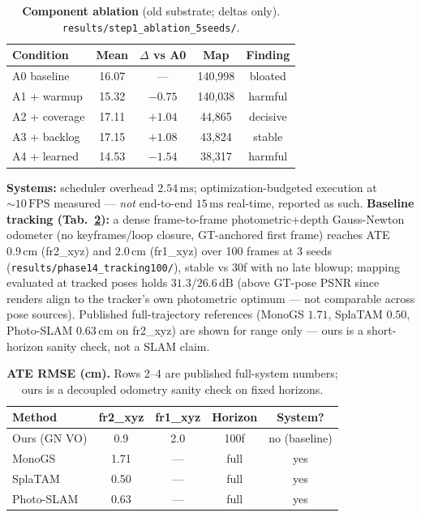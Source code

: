 \documentclass[10pt,twocolumn,letterpaper]{article}
\begin{document}
\begin{table}[tbp]
\centering
\footnotesize\setlength{\tabcolsep}{3pt}
\begin{tabular}{lcccc}
\toprule
\textbf{Condition} & \textbf{Mean} & \textbf{$\Delta$ vs A0} & \textbf{Map} & \textbf{Finding} \\
\midrule
A0 baseline & 16.07 & --- & 140,998 & bloated \\
A1 + warmup & 15.32 & $-0.75$ & 140,038 & harmful \\
A2 + coverage & 17.11 & $+1.04$ & 44,865 & decisive \\
A3 + backlog & 17.15 & $+1.08$ & 43,824 & stable \\
A4 + learned & 14.53 & $-1.54$ & 38,317 & harmful \\
\bottomrule
\end{tabular}
\caption{\textbf{Component ablation} (old substrate; deltas only). \texttt{results/step1\_ablation\_5seeds/}.}
\label{tab:ablation}
\end{table}
\textbf{Systems:} scheduler overhead $2.54\,\mathrm{ms}$; optimization-budgeted execution at $\sim 10\,\mathrm{FPS}$ measured --- \textit{not} end-to-end $15\,\mathrm{ms}$ real-time, reported as such.
\textbf{Baseline tracking (Tab.~\ref{tab:ate}):} a dense frame-to-frame photometric+depth Gauss-Newton odometer (no keyframes/loop closure, GT-anchored first frame) reaches ATE $0.9\,\mathrm{cm}$ (fr2\_xyz) and $2.0\,\mathrm{cm}$ (fr1\_xyz) over 100 frames at 3 seeds (\texttt{results/phase14\_tracking100/}), stable vs 30f with no late blowup; mapping evaluated at tracked poses holds $31.3$/$26.6\,\mathrm{dB}$ (above GT-pose PSNR since renders align to the tracker's own photometric optimum --- not comparable across pose sources).
Published full-trajectory references (MonoGS $1.71$, SplaTAM $0.50$, Photo-SLAM $0.63\,\mathrm{cm}$ on fr2\_xyz) are shown for range only --- ours is a short-horizon sanity check, not a SLAM claim.

\begin{table}[tbp]
\centering
\footnotesize\setlength{\tabcolsep}{3pt}
\begin{tabular}{lcccc}
\toprule
\textbf{Method} & \textbf{fr2\_xyz} & \textbf{fr1\_xyz} & \textbf{Horizon} & \textbf{System?} \\
\midrule
Ours (GN VO) & 0.9 & 2.0 & 100f & no (baseline) \\
MonoGS & 1.71 & --- & full & yes \\
SplaTAM & 0.50 & --- & full & yes \\
Photo-SLAM & 0.63 & --- & full & yes \\
\bottomrule
\end{tabular}
\caption{\textbf{ATE RMSE (cm).} Rows 2--4 are published full-system numbers; ours is a decoupled odometry sanity check on fixed horizons.}
\label{tab:ate}
\end{table}
\end{document}
